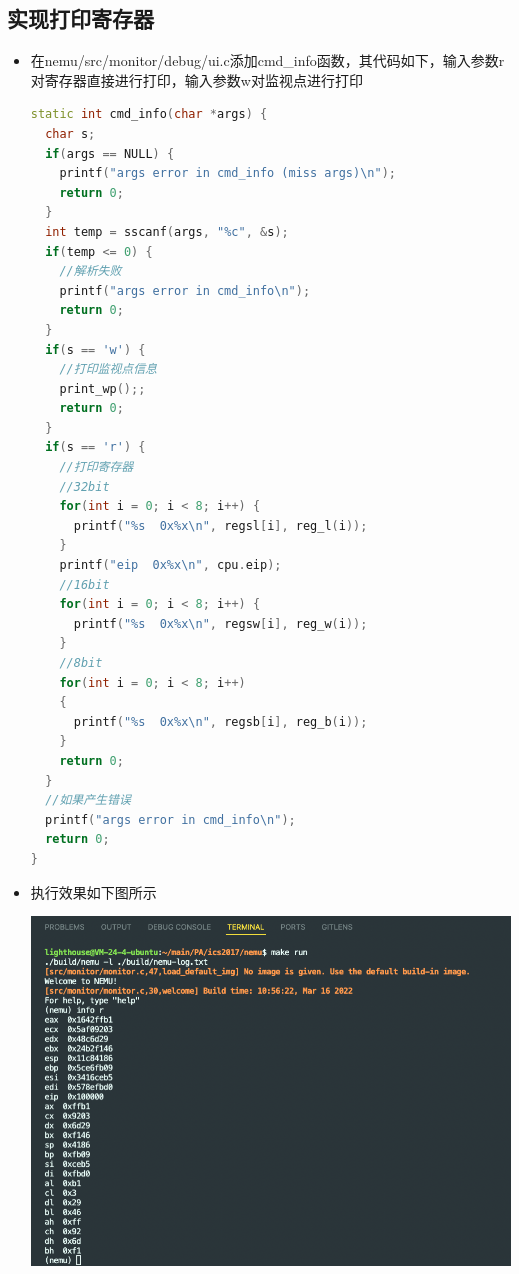 \documentclass[UTF8,a4paper,10pt]{ctexart}
\begin{document}
\subsection{实现打印寄存器}
\begin{itemize}
  \item 在nemu/src/monitor/debug/ui.c添加cmd\_info函数，其代码如下，输入参数r对寄存器直接进行打印，输入参数w对监视点进行打印
  \begin{lstlisting}[language = c++]
static int cmd_info(char *args) {
  char s;
  if(args == NULL) {
    printf("args error in cmd_info (miss args)\n");
    return 0;
  }
  int temp = sscanf(args, "%c", &s);
  if(temp <= 0) {
    //解析失败
    printf("args error in cmd_info\n");
    return 0;
  }
  if(s == 'w') {
    //打印监视点信息
    print_wp();;
    return 0;
  }
  if(s == 'r') {
    //打印寄存器
    //32bit
    for(int i = 0; i < 8; i++) {
      printf("%s  0x%x\n", regsl[i], reg_l(i));
    }
    printf("eip  0x%x\n", cpu.eip);
    //16bit
    for(int i = 0; i < 8; i++) {
      printf("%s  0x%x\n", regsw[i], reg_w(i));
    }
    //8bit
    for(int i = 0; i < 8; i++)
    {
      printf("%s  0x%x\n", regsb[i], reg_b(i));
    }
    return 0;
  }
  //如果产生错误
  printf("args error in cmd_info\n");
  return 0;
}
  \end{lstlisting}
  \item 执行效果如下图所示
  \begin{center}
    \includegraphics[scale = 0.4]{2}
  \end{center}
\end{itemize}
\end{document}
